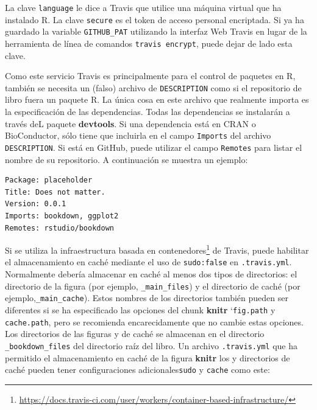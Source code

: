 \documentclass[12pt,]{krantz}
\makeatletter
\newenvironment{Shaded}{\begin{snugshade}}{\end{snugshade}}
\newcommand{\KeywordTok}[1]{\textcolor[rgb]{0.13,0.29,0.53}{\textbf{#1}}}
\newcommand{\FunctionTok}[1]{\textcolor[rgb]{0.00,0.00,0.00}{#1}}
\newcommand{\AttributeTok}[1]{\textcolor[rgb]{0.77,0.63,0.00}{#1}}
\newcommand{\NormalTok}[1]{#1}
\renewcommand{\href}[2]{#2\footnote{\url{#1}}}
\newenvironment{kframe}{%
\medskip{}
\setlength{\fboxsep}{.8em}
 \def\at@end@of@kframe{}%
 \ifinner\ifhmode%
  \def\at@end@of@kframe{\end{minipage}}%
  \begin{minipage}{\columnwidth}%
 \fi\fi%
 \def\FrameCommand##1{\hskip\@totalleftmargin \hskip-\fboxsep
 \colorbox{shadecolor}{##1}\hskip-\fboxsep
     \hskip-\linewidth \hskip-\@totalleftmargin \hskip\columnwidth}%
 \MakeFramed {\advance\hsize-\width
   \@totalleftmargin\z@ \linewidth\hsize
   \@setminipage}}%
 {\par\unskip\endMakeFramed%
 \at@end@of@kframe}
\renewenvironment{Shaded}{\begin{kframe}}{\end{kframe}}
\theoremstyle{definition}
\theoremstyle{definition}
\theoremstyle{definition}
\theoremstyle{remark}
\makeatother
\begin{document}
La clave \texttt{language} le dice a Travis que utilice una máquina
virtual que ha instalado R. La clave \texttt{secure} es el token de
acceso personal encriptada. Si ya ha guardado la variable
\texttt{GITHUB\_PAT} utilizando la interfaz Web Travis en lugar de la
herramienta de línea de comandos \texttt{travis\ encrypt}, puede dejar
de lado esta clave.

Como este servicio Travis es principalmente para el control de paquetes
en R, también se necesita un (falso) archivo de \texttt{DESCRIPTION}
como si el repositorio de libro fuera un paquete R. La única cosa en
este archivo que realmente importa es la especificación de las
dependencias. Todas las dependencias se instalarán a través deL paquete
\textbf{devtools}. Si una dependencia está en CRAN o BioConductor, sólo
tiene que incluirla en el campo \texttt{Imports} del archivo
\texttt{DESCRIPTION}. Si está en GitHub, puede utilizar el campo
\texttt{Remotes} para listar el nombre de su repositorio. A continuación
se muestra un ejemplo:

\begin{verbatim}
Package: placeholder
Title: Does not matter.
Version: 0.0.1
Imports: bookdown, ggplot2
Remotes: rstudio/bookdown
\end{verbatim}

Si se utiliza la
\href{https://docs.travis-ci.com/user/workers/container-based-infrastructure/}{infraestructura
basada en contenedores} de Travis, puede habilitar el almacenamiento en
caché mediante el uso de \texttt{sudo:false} en \texttt{.travis.yml}.
Normalmente debería almacenar en caché al menos dos tipos de
directorios: el directorio de la figura (por ejemplo,
\texttt{\_main\_files}) y el directorio de caché (por
ejemplo,\texttt{\_main\_cache}). Estos nombres de los directorios
también pueden ser diferentes si se ha especificado las opciones del
chunk \textbf{knitr} `\texttt{\textasciigrave{}fig.path} y
\texttt{cache.path}, pero se recomienda encarecidamente que no cambie
estas opciones. Los directorios de las figuras y de caché se almacenan
en el directorio \texttt{\_bookdown\_files} del directorio raíz del
libro. Un archivo \texttt{.travis.yml} que ha permitido el
almacenamiento en caché de la figura \textbf{knitr} los y directorios de
caché pueden tener configuraciones
adicionales\texttt{\textasciigrave{}sudo} y \texttt{cache} como este:

\begin{Shaded}
\end{Shaded}
\end{document}
